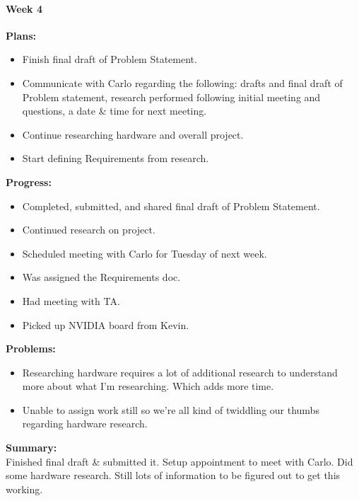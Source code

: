 \paragraph{Week 4}
\begin{adjustwidth}{2.5em}{0pt}
    \vspace{-0.5cm}\textbf{Plans:}
    \vspace{-0.5cm}
    \begin{itemize}
        \item Finish final draft of Problem Statement.
		\item Communicate with Carlo regarding the following: drafts and final draft of Problem statement, research performed following initial meeting and questions, a date \& time for next meeting.
		\item Continue researching hardware and overall project.
		\item Start defining Requirements from research.
    \end{itemize} 
    \vspace{-0.3cm}\textbf{Progress:}
    \vspace{-0.5cm}
    \begin{itemize}
        \item Completed, submitted, and shared final draft of Problem Statement. 
		\item Continued research on project.
		\item Scheduled meeting with Carlo for Tuesday of next week.
		\item Was assigned the Requirements doc.
		\item Had meeting with TA.
		\item Picked up NVIDIA board from Kevin.
    \end{itemize} 
    \vspace{-0.3cm}\textbf{Problems:}
    \vspace{-0.5cm}
    \begin{itemize}
        \item Researching hardware requires a lot of additional research to understand more about what I'm researching. Which adds more time.
		\item Unable to assign work still so we're all kind of twiddling our thumbs regarding hardware research.
    \end{itemize}  
    \vspace{-0.3cm}\noindent\textbf{Summary:}\\
    \noindent Finished final draft \& submitted it. Setup appointment to meet with Carlo. Did some hardware research. Still lots of information to be figured out to get this working.
\end{adjustwidth} 

